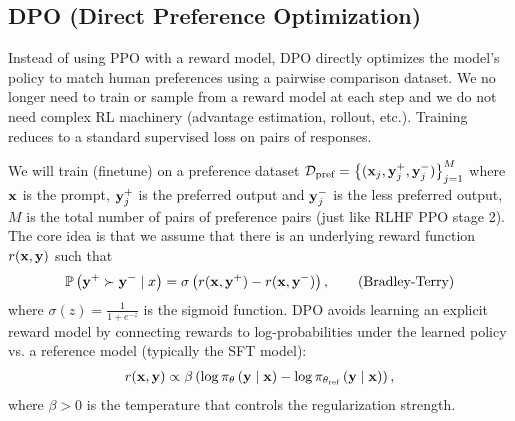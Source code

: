 \documentclass[11pt]{article}  %
\begin{document}
\subsection{DPO (Direct Preference Optimization)}
Instead of using PPO with a reward model, DPO directly optimizes the model's policy to match human preferences using a pairwise comparison dataset.
We no longer need to train or sample from a reward model at each step and we do not need complex RL machinery (advantage estimation, rollout, etc.).
Training reduces to a standard supervised loss on pairs of responses.

We will train (finetune) on a preference dataset $\mathcal{D}_{\text{pref}} = \left\{ (\mathbf{x}_j, \mathbf{y}_j^+, \mathbf{y}_j^-) \right\}_{j=1}^M$ where $\mathbf{x}$ is the prompt, $\mathbf{y}_j^+$ is the preferred output and $\mathbf{y}_j^-$ is the less preferred output, $M$ is the total number of pairs of preference pairs (just like RLHF PPO stage 2).
The core idea is that we assume that there is an underlying reward function $r(\mathbf{x}, \mathbf{y})$ such that 
\begin{align}
  \mathbb{P}\left( \mathbf{y}^{+} \succ \mathbf{y}^{-} \mid x \right) = \sigma\left( r(\mathbf{x}, \mathbf{y}^{+}) - r(\mathbf{x}, \mathbf{y}^{-}) \right), \tag{Bradley-Terry} 
\end{align}
where $\sigma(z) = \frac{1}{1 + e^{-z}}$ is the sigmoid function.
DPO avoids learning an explicit reward model by connecting rewards to log-probabilities under the learned policy vs. a reference model (typically the SFT model):
\begin{align*}
  r(\mathbf{x}, \mathbf{y}) \propto \beta\left( \log \pi_{\theta}\left( \mathbf{y} \mid \mathbf{x} \right) - \log \pi_{\theta_{\text{ref}}}\left( \mathbf{y} \mid \mathbf{x} \right) \right),
\end{align*}
where $\beta > 0$ is the temperature that controls the regularization strength.
\end{document}
